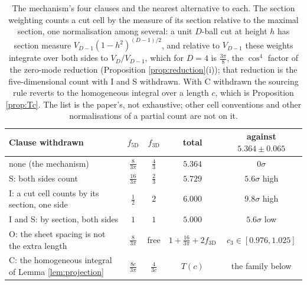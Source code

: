 \documentclass[11pt]{article}
\theoremstyle{definition}
\begin{document}
\begin{table}[htbp]\centering\small
\begin{tabular}{lcccc}
\toprule
Clause withdrawn & $f_{5\mathrm{D}}$ & $f_{3\mathrm{D}}$ & total & against $5.364 \pm 0.065$ \\
\midrule
none (the mechanism) & $\tfrac{8}{3\pi}$ & $\tfrac{4}{3}$ & $5.364$ & $0\sigma$ \\[2pt]
S: both sides count & $\tfrac{16}{3\pi}$ & $\tfrac{2}{3}$ & $5.729$ & $5.6\sigma$ high \\[2pt]
I: a cut cell counts by its section, one side & $\tfrac{1}{2}$ & $2$ & $6.000$ & $9.8\sigma$ high \\[2pt]
I and S: by section, both sides & $1$ & $1$ & $5.000$ & $5.6\sigma$ low \\[2pt]
O: the sheet spacing is not the extra length & $\tfrac{8}{3\pi}$ & free & $1 + \tfrac{16}{3\pi} + 2f_{3\mathrm{D}}$ & $c_{3} \in [0.976, 1.025]$ \\[2pt]
C: the homogeneous integral of Lemma \ref{lem:projection} & $\tfrac{8c}{3\pi}$ & $\tfrac{4}{3c}$ & $T(c)$ & the family below \\
\bottomrule
\end{tabular}
\caption{The mechanism's four clauses and the nearest alternative to each. The section weighting counts a cut cell by the measure of its section relative to the maximal section, one normalisation among several: a unit $D$-ball cut at height $h$ has section measure $V_{D-1}(1 - h^{2})^{(D-1)/2}$, and relative to $V_{D-1}$ these weights integrate over both sides to $V_{D}/V_{D-1}$, which for $D = 4$ is $\tfrac{3\pi}{8}$, the $\cos^{4}$ factor of the zero-mode reduction (Proposition \ref{prop:reduction}(i)); that reduction is the five-dimensional count with I and S withdrawn. With C withdrawn the sourcing rule reverts to the homogeneous integral over a length $c$, which is Proposition \ref{prop:Tc}. The list is the paper's, not exhaustive; other cell conventions and other normalisations of a partial count are not on it.}
\label{tab:excludes}
\end{table}
\end{document}
